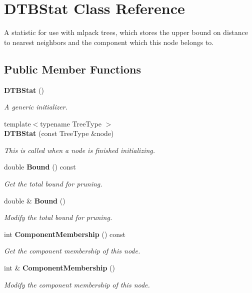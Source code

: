 \section{D\+T\+B\+Stat Class Reference}
\label{classmlpack_1_1emst_1_1DTBStat}


A statistic for use with mlpack trees, which stores the upper bound on distance to nearest neighbors and the component which this node belongs to.  


\subsection*{Public Member Functions}
\begin{DoxyCompactItemize}
\item 
\textbf{ D\+T\+B\+Stat} ()
\begin{DoxyCompactList}\small\item\em A generic initializer. \end{DoxyCompactList}\item 
{\footnotesize template$<$typename Tree\+Type $>$ }\\\textbf{ D\+T\+B\+Stat} (const Tree\+Type \&node)
\begin{DoxyCompactList}\small\item\em This is called when a node is finished initializing. \end{DoxyCompactList}\item 
double \textbf{ Bound} () const
\begin{DoxyCompactList}\small\item\em Get the total bound for pruning. \end{DoxyCompactList}\item 
double \& \textbf{ Bound} ()
\begin{DoxyCompactList}\small\item\em Modify the total bound for pruning. \end{DoxyCompactList}\item 
int \textbf{ Component\+Membership} () const
\begin{DoxyCompactList}\small\item\em Get the component membership of this node. \end{DoxyCompactList}\item 
int \& \textbf{ Component\+Membership} ()
\begin{DoxyCompactList}\small\item\em Modify the component membership of this node. \end{DoxyCompactList}\item 

\end{DoxyCompactItemize}
